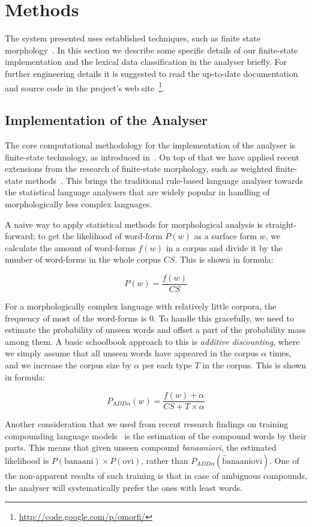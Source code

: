 \documentclass[a4paper,12pt]{article}
\begin{document}
\section{Methods}

The system presented uses established techniques, such as finite state
morphology~\cite{beesley2003finite}. In this section we describe some specific
details of our finite-state implementation and the lexical data classification
in the analyser briefly. For further engineering details it is suggested to
read the up-to-date documentation and source code in the project's web
site~\footnote{\url{http://code.google.com/p/omorfi/}}.

\subsection{Implementation of the Analyser}

The core computational methodology for the implementation of the analyser is
finite-state technology, as introduced
in~\cite{koskenniemi1983twolevel,beesley2003finite}. On top of that we
have applied recent extensions from the research of finite-state morphology,
such as weighted finite-state methods~\cite{openfst,hfst2012}. This brings the
traditional rule-based language analyser towards the statistical language
analysers that are widely popular in handling of morphologically less
complex languages.

A naive way to apply statistical methods for morphological analysis is
straight-forward; to get the likelihood of word-form $P(w)$ as a surface form
$w$, we calculate the amount of word-forms $f(w)$ in a corpus and divide it by
the number of word-forms in the whole corpus $CS$. This is shown in formula:

$$
P(w) = \frac{f(w)}{CS}
$$

For a morphologically complex language with relatively little corpora, the
frequency of most of the word-forms is $0$. To handle this gracefully, we need
to estimate the probability of unseen words and offset a part of the
probability mass among them. A basic schoolbook approach to this is
\emph{additive discounting}, where we simply assume that all unseen words have
appeared in the corpus $\alpha$ times, and we increase the corpus size by
$\alpha$ per each type $T$ in the corpus. This is shown in formula:

$$
P_{ADD\alpha}(w) = \frac{f(w) + \alpha}{CS + T \times \alpha}
$$

Another consideration that we used from recent research findings on training
compounding language models~\citep{pirinen2009weighting} is the estimation of
the compound words by their parts. This means that given unseen compound
\emph{banaaniovi}, the estimated likelihood is $P(\mathrm{banaani}) \times
P(\mathrm{ovi})$, rather than $P_{ADD\alpha}(\mathrm{\hat banaaniovi})$. One of
the non-apparent results of such training is that in case of ambiguous
compounds, the analyser will systematically prefer the ones with least words.
\end{document}
